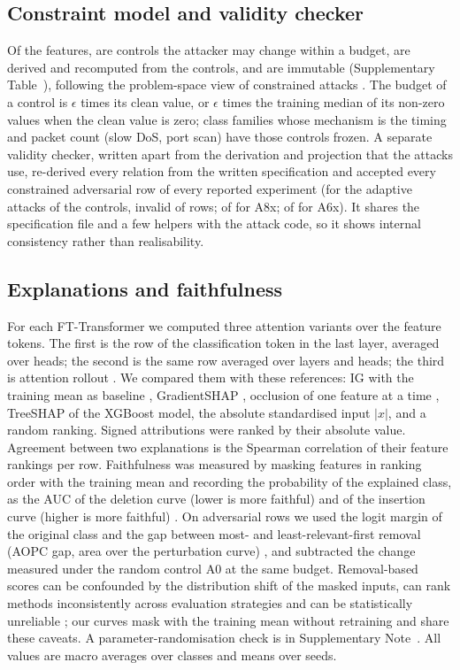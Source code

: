 \subsection*{Constraint model and validity checker}
\label{sec:constraints}
Of the \nFeatures{} features, \nControls{} are controls the attacker may change within a budget, \nDerived{} are
derived and recomputed from the controls, and \nImmutable{} are immutable (Supplementary Table~\suppTabConstraints),
following the problem-space view of constrained attacks \cite{pierazzi2020,alhussien2024}.
The budget of a control is $\epsilon$ times its clean value, or $\epsilon$ times the training median of its non-zero
values when the clean value is zero; class families whose mechanism is the timing and packet count (slow DoS, port
scan) have those controls frozen.
A separate validity checker, written apart from the derivation and projection that the attacks use, re-derived every
relation from the written specification and accepted every constrained adversarial row of every reported experiment
(for the adaptive attacks of the controls, \sbInvalid{} invalid of \sbRows{} rows; \axInvalid{} of \axRows{} for A8x;
\sxInvalid{} of \sxRowsWritten{} for A6x).
It shares the specification file and a few helpers with the attack code, so it shows internal consistency rather than
realisability.

\subsection*{Explanations and faithfulness}
For each FT-Transformer we computed three attention variants over the feature tokens.
The first is the row of the classification token in the last layer, averaged over heads; the second is the same row
averaged over layers and heads; the third is attention rollout \cite{abnar2020}.
We compared them with these references: IG with the training mean as baseline \cite{sundararajan2017},
Gradient\-SHAP \cite{lundberg2017}, occlusion of one feature at a time \cite{zeiler2014}, Tree\-SHAP of the XGBoost
model, the absolute standardised input $|x|$, and a random ranking.
Signed attributions were ranked by their absolute value.
Agreement between two explanations is the Spearman correlation of their feature rankings per row.
Faithfulness was measured by masking features in ranking order with the training mean and recording the probability
of the explained class, as the AUC of the deletion curve (lower is more faithful) and of the insertion curve (higher is
more faithful) \cite{petsiuk2018,samek2017}.
On adversarial rows we used the logit margin of the original class and the gap between most- and least-relevant-first
removal (AOPC gap, area over the perturbation curve) \cite{samek2017}, and subtracted the change measured under the
random control A0 at the same budget.
Removal-based scores can be confounded by the distribution shift of the masked inputs, can rank methods inconsistently
across evaluation strategies and can be statistically unreliable \cite{hooker2019,rong2022,tomsett2020}; our curves
mask with the training mean without retraining and share these caveats.
A parameter-randomisation check \cite{adebayo2018} is in Supplementary Note~\suppNoteRand.
All values are macro averages over classes and means over seeds.

